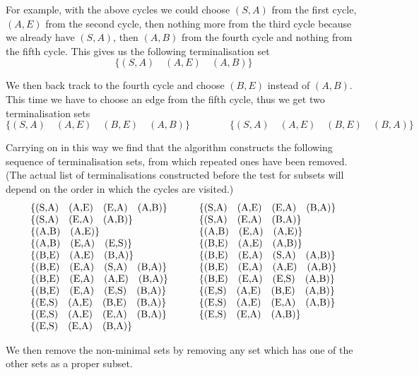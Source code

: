 For example, with the above cycles
we could choose $(S,A)$ from the first cycle, $(A,E)$ from the second
cycle, then nothing more from the third cycle because we already have
$(S,A)$, then $(A,B)$ from the fourth cycle and nothing from the fifth
cycle. This gives us the following terminalisation set
$$
\{(S,A)\quad (A,E)\quad  (A,B)\}
$$

We then back track to the fourth cycle and choose $(B,E)$ instead of
$(A,B)$. This time we have to choose an edge from the fifth cycle,
thus we get two terminalisation sets
$$
\{(S,A)\quad (A,E)\quad  (B,E)\quad  (A,B)\}\qquad\qquad
\{(S,A)\quad (A,E)\quad  (B,E)\quad  (B,A)\}\qquad\qquad
$$

Carrying on in this way we find that the algorithm constructs the
following sequence of terminalisation sets, from which
repeated ones have been removed.
(The actual list of terminalisations constructed before the test for
subsets will depend on the order in which the cycles are visited.)
$$
\begin{tabular}{ll}
\{(S,A)\quad (A,E)\quad  (E,A)\quad  (A,B)\}\qquad\qquad&
\{(S,A)\quad (A,E)\quad  (E,A)\quad  (B,A)\}\\
\{(S,A)\quad (E,A)\quad  (A,B)\}& 
\{(S,A)\quad (E,A)\quad  (B,A)\}\\
\{(A,B)\quad (A,E)\}& 
\{(A,B)\quad (E,A)\quad  (A,E)\}\\
\{(A,B)\quad (E,A)\quad  (E,S)\}&
\{(B,E)\quad (A,E)\quad (A,B)\}\\
\{(B,E)\quad (A,E)\quad  (B,A)\}&
\{(B,E)\quad (E,A)\quad (S,A)\quad (A,B)\}\\
\{(B,E)\quad (E,A)\quad (S,A)\quad (B,A)\}&
\{(B,E)\quad (E,A)\quad (A,E)\quad (A,B)\}\\
\{(B,E)\quad (E,A)\quad (A,E)\quad (B,A)\}&
\{(B,E)\quad (E,A)\quad (E,S)\quad (A,B)\}\\ 
\{(B,E)\quad (E,A)\quad (E,S)\quad (B,A)\}&
\{(E,S)\quad (A,E)\quad  (B,E)\quad (A,B)\}\\
\{(E,S)\quad (A,E)\quad  (B,E)\quad (B,A)\}&
\{(E,S)\quad (A,E)\quad  (E,A)\quad (A,B)\}\\
\{(E,S)\quad (A,E)\quad  (E,A)\quad (B,A)\}&
\{(E,S)\quad (E,A)\quad  (A,B)\}\\
\{(E,S)\quad (E,A)\quad  (B,A)\}\\
\end{tabular}
$$

We then remove the non-minimal sets by removing any set which has one
of the other sets as a proper subset.

